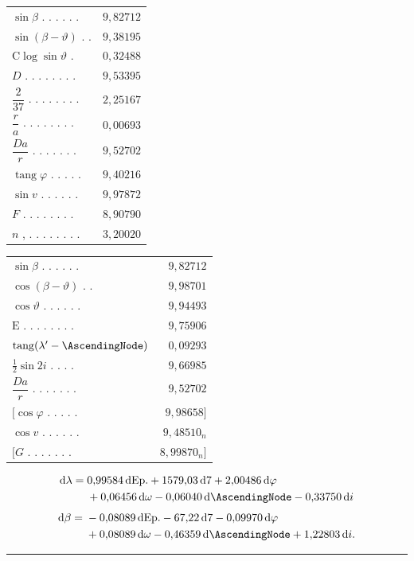 \begin{center}
\renewcommand{\arraystretch}{1.4}
\begin{tabular}{@{}lr@{}}
\(\sin\beta\) . . . . . . & \(9{,}82712\)\\
\(\sin(\beta-\vartheta)\) . . & \(9{,}38195\)\\
\(\mathrm{C}\log\sin\vartheta\) . & \(0{,}32488\)\\
\hline
\(D\) . . . . . . . . & \(9{,}53395\)\\
\(\dfrac{2}{3\mathord{7}}\) . . . . . . . . & \(2{,}25167\)\\[4pt]
\(\dfrac{r}{a}\) . . . . . . . . & \(0{,}00693\)\\[4pt]
\(\dfrac{Da}{r}\) . . . . . . . & \(9{,}52702\)\\
\(\operatorname{tang}\varphi\) . . . . . & \(9{,}40216\)\\
\(\sin v\) . . . . . . & \(9{,}97872\)\\
\hline
\(F\) . . . . . . . . & \(8{,}90790\)\\
\(n\) , . . . . . . . . & \(3{,}20020\)\\
\end{tabular}
\end{center}
\begin{center}
\renewcommand{\arraystretch}{1.4}
\begin{tabular}{@{}lr@{}}
\(\sin\beta\) . . . . . . & \(9{,}82712\)\\
\(\cos(\beta-\vartheta)\) . . & \(9{,}98701\)\\
\(\cos\vartheta\) . . . . . . & \(9{,}94493\)\\
\hline
\(\mathrm{E}\) . . . . . . . . & \(9{,}75906\)\\
\(\operatorname{tang}(\lambda^{\prime}-\AscendingNode)\)  & \(0{,}09293\)\\
\(\tfrac12\sin2i\) . . . . & \(9{,}66985\)\\
\(\dfrac{Da}{r}\) . . . . . . . & \(9{,}52702\)\\
\([\cos\varphi\) . . . . . & \(9{,}98658]\)\\
\(\cos v\) . . . . . . & \(9{,}48510_n\)\\
\hline
\([G\) . . . . . . . & \(8{,}99870_n]\)\\
\end{tabular}
\end{center}
\[
\begin{aligned}
\mathrm{d}\lambda={}&0{,}99584\,\mathrm{dEp.}+1579{,}03\,\mathrm{d}\mathord{7}+2{,}00486\,\mathrm{d}\varphi\\
&+0{,}06456\,\mathrm{d}\omega-0{,}06040\,\mathrm{d}\AscendingNode-0{,}33750\,\mathrm{d}i
\end{aligned}
\]
\[
\begin{aligned}
\mathrm{d}\beta={}&-0{,}08089\,\mathrm{dEp.}-67{,}22\,\mathrm{d}\mathord{7}-0{,}09970\,\mathrm{d}\varphi\\
&+0{,}08089\,\mathrm{d}\omega-0{,}46359\,\mathrm{d}\AscendingNode+1{,}22803\,\mathrm{d}i.
\end{aligned}
\]
\par\medskip\begin{center}\rule{.22\textwidth}{.3pt}\end{center}
